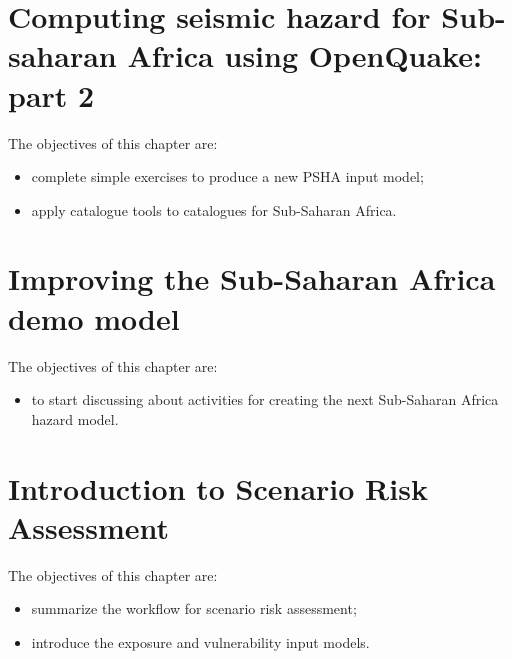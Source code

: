 \documentclass[11pt,a4paper,headings=small,dvips]{scrbook}
\newenvironment{myfancybox}{%
  \def\FrameCommand{\fboxsep=\FrameSep \fcolorbox{blue01}{honeydew}}%
  \color{black}\MakeFramed {\FrameRestore}}%
 {\endMakeFramed}
\begin{document}
\chapter{Computing seismic hazard for Sub-saharan Africa using OpenQuake: part 2}
\begin{myfancybox}
The objectives of this chapter are:
\begin{itemize}
    \item complete simple exercises to produce a new PSHA input model;
    \item apply catalogue tools to catalogues for Sub-Saharan Africa.
\end{itemize}
\end{myfancybox}
    
\cleardoublepage
\chapter{Improving the Sub-Saharan Africa demo model}
\begin{myfancybox}
The objectives of this chapter are:
\begin{itemize}
    \item to start discussing about activities for creating the next Sub-Saharan 
        Africa hazard model.
\end{itemize}
\end{myfancybox}
    
\cleardoublepage
\chapter{Introduction to Scenario Risk Assessment}
\begin{myfancybox}
The objectives of this chapter are:
\begin{itemize}
    \item summarize the workflow for scenario risk assessment;
    \item introduce the exposure and vulnerability input models.
\end{itemize}
\end{myfancybox}
    
\cleardoublepage
\end{document}
